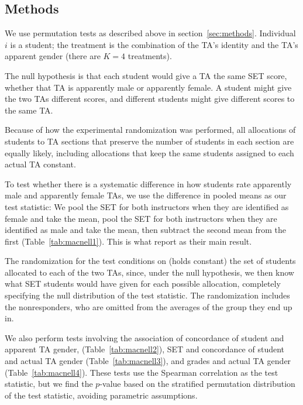 \documentclass[12pt]{article}
\begin{document}
\subsection{Methods}\label{macnell:methods}
We use permutation tests as described above in section~\ref{sec:methods}.
Individual $i$ is a student; the treatment is the combination of the TA's identity and the TA's
apparent gender (there are $K=4$ treatments).

The null hypothesis is that each student would give a TA the same SET score,
whether that TA is apparently male or apparently female.
A student might give the two TAs different scores,
and different students might give different scores to the same TA. 

Because of how the experimental randomization was performed, all allocations of students to 
TA sections that preserve the number of students in each section are equally likely,  
including allocations that keep the same students assigned to each actual TA constant.

To test whether there is a systematic difference in how students rate apparently male and 
apparently female TAs, we use the difference in pooled means as our test statistic:
We pool the SET for both instructors when they are identified as female
and take the mean, pool the SET for both instructors when they are identified as male
and take the mean, then subtract the second mean from the first (Table~\ref{tab:macnell1}).
This is what \cite{MacNell2014} report as their main result.

The randomization for the test conditions on (holds constant) the set of students 
allocated to each of the two TAs, since, under the null hypothesis, we then know what 
SET students would have given for each possible allocation, completely specifying the
null distribution of the test statistic.
The randomization includes the nonresponders, who are omitted from the averages of the
group they end up in.

We also perform tests involving the association of concordance of student and apparent TA
gender,
(Table~\ref{tab:macnell2}), SET and concordance of student and actual TA gender 
(Table~\ref{tab:macnell3}), and grades and actual TA gender (Table~\ref{tab:macnell4}).  
These tests use the Spearman correlation as the test statistic, but we find the $p$-value
based on the stratified permutation distribution of the test statistic, avoiding
parametric assumptions.
\end{document}
